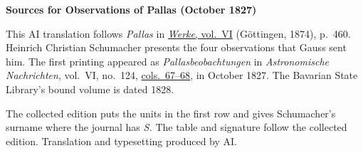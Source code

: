 \clearpage\thispagestyle{empty}
\begin{center}\textbf{Sources for Observations of Pallas (October 1827)}\end{center}
\noindent This AI translation follows \textit{Pallas} in \href{https://gdz.sub.uni-goettingen.de/id/PPN236007467}{\textit{Werke}, vol.~VI} (Göttingen, 1874), p.~460. Heinrich Christian Schumacher presents the four observations that Gauss sent him. The first printing appeared as \textit{Pallasbeobachtungen} in \textit{Astronomische Nachrichten}, vol.~VI, no.~124, \href{https://api.digitale-sammlungen.de/iiif/image/v2/bsb10049431_00050/full/1550,/0/default.jpg}{cols.~67--68}, in October 1827. The Bavarian State Library’s bound volume is dated 1828.
\par\smallskip\noindent The collected edition puts the units in the first row and gives Schumacher’s surname where the journal has \textit{S.} The table and signature follow the collected edition. Translation and typesetting produced by AI.
\clearpage
